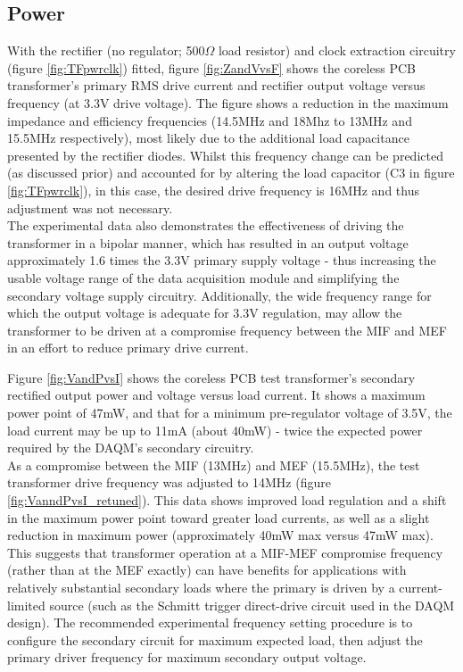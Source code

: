 \documentclass[conference]{IEEEtran}
\begin{document}
	\subsection{Power}
	With the rectifier (no regulator; 500$\Omega$ load resistor) and clock extraction circuitry (figure \ref{fig:TFpwrclk}) fitted, figure \ref{fig:ZandVvsF} shows the coreless PCB transformer's primary RMS drive current and rectifier output voltage versus frequency (at 3.3V drive voltage).  
	The figure shows a reduction in the maximum impedance and efficiency frequencies (14.5MHz and 18Mhz to 13MHz and 15.5MHz respectively), most likely due to the additional load capacitance presented by the rectifier diodes.  Whilst this frequency change can be predicted (as discussed prior) and accounted for by altering the load capacitor (C3 in figure \ref{fig:TFpwrclk}), in this case, the desired drive frequency is 16MHz and thus adjustment was not necessary.  \\
	The experimental data also demonstrates the effectiveness of driving the transformer in a bipolar manner, which has resulted in an output voltage approximately 1.6 times the 3.3V primary supply voltage - thus increasing the usable voltage range of the data acquisition module and simplifying the secondary voltage supply circuitry.  Additionally, the wide frequency range for which the output voltage is adequate for 3.3V regulation, may allow the transformer to be driven at a compromise frequency between the MIF and MEF in an effort to reduce primary drive current.
	
	Figure \ref{fig:VandPvsI} shows the coreless PCB test transformer's secondary rectified output power and voltage versus load current.  It shows a maximum power point of 47mW, and that for a minimum pre-regulator voltage of 3.5V, the load current may be up to 11mA (about 40mW) - twice the expected power required by the DAQM's secondary circuitry.  \\
	As a compromise between the MIF (13MHz) and MEF (15.5MHz), the test transformer drive frequency was adjusted to 14MHz (figure \ref{fig:VanndPvsI_retuned}).  This data shows improved load regulation and a shift in the maximum power point toward greater load currents, as well as a slight reduction in maximum power (approximately 40mW max versus 47mW max).  This suggests that transformer operation at a MIF-MEF compromise frequency (rather than at the MEF exactly) can have benefits for applications with relatively substantial secondary loads where the primary is driven by a current-limited source (such as the Schmitt trigger direct-drive circuit used in the DAQM design).  The recommended experimental frequency setting procedure is to configure the secondary circuit for maximum expected load, then adjust the primary driver frequency for maximum secondary output voltage.
\end{document}
